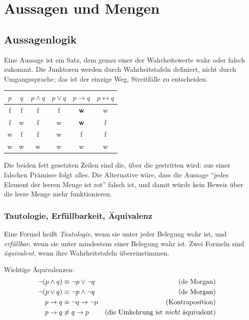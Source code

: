 \documentclass[12pt, a4paper]{article}
\begin{document}
\section{Aussagen und Mengen}

\subsection{Aussagenlogik}

Eine Aussage ist ein Satz, dem genau einer der Wahrheitswerte wahr oder
falsch zukommt. Die Junktoren werden durch Wahrheitstafeln definiert, nicht
durch Umgangssprache; das ist der einzige Weg, Streitfälle zu entscheiden.

\begin{center}
\begin{tabular}{cc|cccc}
\toprule
$p$ & $q$ & $p \wedge q$ & $p \vee q$ & $p \to q$ & $p \leftrightarrow q$\\
\midrule
f & f & f & f & \textbf{w} & w\\
f & w & f & w & \textbf{w} & f\\
w & f & f & w & f & f\\
w & w & w & w & w & w\\
\bottomrule
\end{tabular}
\end{center}

\begin{notebox}
Die beiden fett gesetzten Zeilen sind die, über die gestritten wird: aus einer
falschen Prämisse folgt alles. Die Alternative wäre, dass die Aussage
"`jedes Element der leeren Menge ist rot"' falsch ist, und damit würde kein
Beweis über die leere Menge mehr funktionieren.
\end{notebox}

\subsubsection{Tautologie, Erfüllbarkeit, Äquivalenz}

\begin{definitionbox}
Eine Formel heißt \emph{Tautologie}, wenn sie unter jeder Belegung wahr ist,
und \emph{erfüllbar}, wenn sie unter mindestens einer Belegung wahr ist. Zwei
Formeln sind \emph{äquivalent}, wenn ihre Wahrheitstafeln übereinstimmen.
\end{definitionbox}

Wichtige Äquivalenzen:
\begin{align*}
  \neg(p \wedge q) &\equiv \neg p \vee \neg q & \text{(de Morgan)}\\
  \neg(p \vee q) &\equiv \neg p \wedge \neg q & \text{(de Morgan)}\\
  p \to q &\equiv \neg q \to \neg p & \text{(Kontraposition)}\\
  p \to q &\not\equiv q \to p & \text{(die Umkehrung ist \emph{nicht} äquivalent)}
\end{align*}
\end{document}
